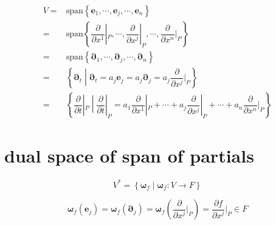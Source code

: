\documentclass[
]{book}
\theoremstyle{definition}
\theoremstyle{definition}
\theoremstyle{definition}
\theoremstyle{definition}
\theoremstyle{remark}
\begin{document}
\[
\begin{aligned}
V= & \mathrm{span}\left\{ \boldsymbol{e}_{{\scriptscriptstyle 1}},\cdots,\boldsymbol{e}_{{\scriptscriptstyle j}},\cdots,\boldsymbol{e}_{{\scriptscriptstyle n}}\right\} \\
= & \mathrm{span}\left\{ \dfrac{\partial}{\partial x^{{\scriptscriptstyle 1}}}|_{{\scriptscriptstyle P}},\cdots,\dfrac{\partial}{\partial x^{{\scriptscriptstyle j}}}|_{{\scriptscriptstyle P}},\cdots,\dfrac{\partial}{\partial x^{{\scriptscriptstyle n}}}|_{{\scriptscriptstyle P}}\right\} \\
= & \mathrm{span}\left\{ \boldsymbol{\partial}_{{\scriptscriptstyle 1}},\cdots,\boldsymbol{\partial}_{{\scriptscriptstyle j}},\cdots,\boldsymbol{\partial}_{{\scriptscriptstyle n}}\right\} \\
= & \left\{ \boldsymbol{\partial}_{{\scriptscriptstyle t}}\middle|\boldsymbol{\partial}_{{\scriptscriptstyle t}}=a_{{\scriptscriptstyle j}}\boldsymbol{e}_{{\scriptscriptstyle j}}=a_{{\scriptscriptstyle j}}\boldsymbol{\partial}_{{\scriptscriptstyle j}}=a_{{\scriptscriptstyle j}}\dfrac{\partial}{\partial x^{{\scriptscriptstyle j}}}|_{{\scriptscriptstyle P}}\right\} \\
= & \left\{ \dfrac{\partial}{\partial t}|_{{\scriptscriptstyle P}}\middle|\dfrac{\partial}{\partial t}|_{{\scriptscriptstyle P}}=a_{{\scriptscriptstyle 1}}\dfrac{\partial}{\partial x^{{\scriptscriptstyle 1}}}|_{{\scriptscriptstyle P}}+\cdots+a_{{\scriptscriptstyle j}}\dfrac{\partial}{\partial x^{{\scriptscriptstyle j}}}|_{{\scriptscriptstyle P}}+\cdots+a_{{\scriptscriptstyle n}}\dfrac{\partial}{\partial x^{{\scriptscriptstyle n}}}|_{{\scriptscriptstyle P}}\right\} 
\end{aligned}
\]

\hypertarget{dual-space-of-span-of-partials}{%
\section{dual space of span of partials}\label{dual-space-of-span-of-partials}}

\[
V^{*}=\left\{ \boldsymbol{\omega}_{{\scriptscriptstyle f}}\middle|\boldsymbol{\omega}_{{\scriptscriptstyle f}}:V\rightarrow F\right\} 
\]

\[
\boldsymbol{\omega}_{{\scriptscriptstyle f}}\left(\boldsymbol{e}_{{\scriptscriptstyle j}}\right)=\boldsymbol{\omega}_{{\scriptscriptstyle f}}\left(\boldsymbol{\partial}_{{\scriptscriptstyle j}}\right)=\boldsymbol{\omega}_{{\scriptscriptstyle f}}\left(\dfrac{\partial}{\partial x^{{\scriptscriptstyle j}}}|_{{\scriptscriptstyle P}}\right)=\dfrac{\partial f}{\partial x^{{\scriptscriptstyle j}}}|_{{\scriptscriptstyle P}}\in F
\]
\end{document}
